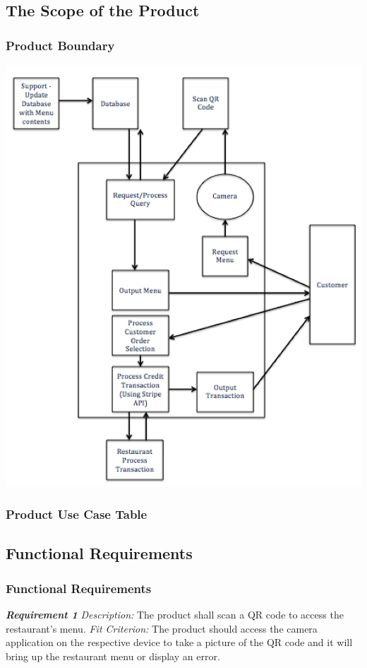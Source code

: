 \documentclass[12pt, titlepage]{article}
\begin{document}
\subsection{The Scope of the Product}
\subsubsection{Product Boundary}
\includegraphics{ProductBoundary.png}
\subsubsection{Product Use Case Table}
\subsection{Functional Requirements}

\subsubsection{Functional Requirements}

\textbf{\textit{Requirement 1}}\newline
\textit{Description:}\newline
The product shall scan a QR code to access the restaurant's menu.\newline\newline
\textit{Fit Criterion:}\newline 
The product should access the camera application on the respective device to take a picture of the QR code and it will bring up the restaurant menu or display an error.
\newline
\end{document}
